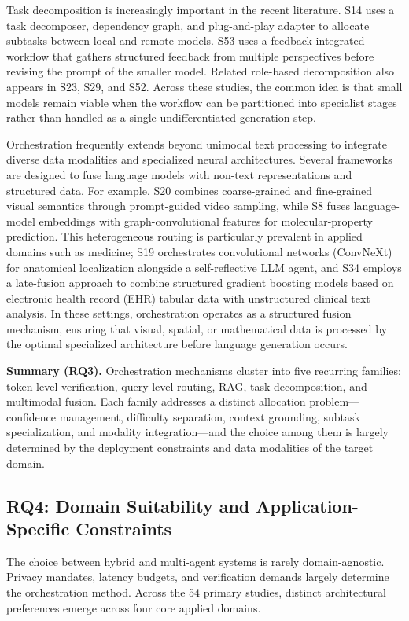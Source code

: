 Task decomposition is increasingly important in the recent literature. S14 uses a task decomposer, dependency graph, and plug-and-play adapter to allocate subtasks between local and remote models. S53 uses a feedback-integrated workflow that gathers structured feedback from multiple perspectives before revising the prompt of the smaller model. Related role-based decomposition also appears in S23, S29, and S52. Across these studies, the common idea is that small models remain viable when the workflow can be partitioned into specialist stages rather than handled as a single undifferentiated generation step.

Orchestration frequently extends beyond unimodal text processing to integrate diverse data modalities and specialized neural architectures. Several frameworks are designed to fuse language models with non-text representations and structured data. For example, S20 combines coarse-grained and fine-grained visual semantics through prompt-guided video sampling, while S8 fuses language-model embeddings with graph-convolutional features for molecular-property prediction. This heterogeneous routing is particularly prevalent in applied domains such as medicine; S19 orchestrates convolutional networks (ConvNeXt) for anatomical localization alongside a self-reflective LLM agent, and S34 employs a late-fusion approach to combine structured gradient boosting models based on electronic health record (EHR) tabular data with unstructured clinical text analysis. In these settings, orchestration operates as a structured fusion mechanism, ensuring that visual, spatial, or mathematical data is processed by the optimal specialized architecture before language generation occurs.

\noindent\textbf{Summary (RQ3).} Orchestration mechanisms cluster into five recurring families: token-level verification, query-level routing, RAG, task decomposition, and multimodal fusion. Each family addresses a distinct allocation problem---confidence management, difficulty separation, context grounding, subtask specialization, and modality integration---and the choice among them is largely determined by the deployment constraints and data modalities of the target domain.

\subsection{RQ4: Domain Suitability and Application-Specific Constraints}
\label{sec:rq4}
The choice between hybrid and multi-agent systems is rarely domain-agnostic. Privacy mandates, latency budgets, and verification demands largely determine the orchestration method. Across the 54 primary studies, distinct architectural preferences emerge across four core applied domains.

